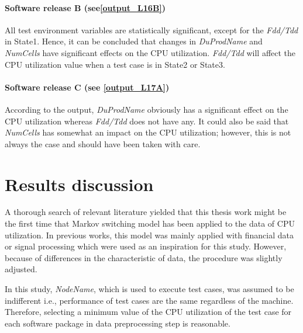 \paragraph{Software release B (see\ref{output_L16B})}

All test environment variables are statistically significant, except
for the \emph{Fdd/Tdd} in State1. Hence, it can be concluded that
changes in \emph{DuProdName} and \emph{NumCells} have significant
effects on the CPU utilization. \emph{Fdd/Tdd} will affect the CPU
utilization value when a test case is in State2 or State3. 

\paragraph{Software release C (see \ref{output_L17A})}

According to the output, \emph{DuProdName} obviously has a significant
effect on the CPU utilization whereas\emph{ Fdd/Tdd} does not have
any. It could also be said that \emph{NumCells} has somewhat an impact
on the CPU utilization; however, this is not always the case and should
have been taken with care.

\section{Results discussion\label{sec:Results-discussion}}

A thorough search of relevant literature yielded that this thesis
work might be the first time that Markov switching model has been
applied to the data of CPU utilization. In previous works, this model
was mainly applied with financial data or signal processing which
were used as an inspiration for this study. However, because of differences
in the characteristic of data, the procedure was slightly adjusted.
\begin{comment}
A large amount of time was spent on understanding the data, examining
which variables had a significant impact on the CPU utilization, and
determining which methods would provide the best possible outcome
for this problem. Besides, after deciding on the most promising method,
a lot of effort was invested studying implemented algorithms in the
R package as well as modifying code as necessary. 
\end{comment}

In this study, \emph{NodeName}, which is used to execute test cases,
was assumed to be indifferent i.e., performance of test cases are
the same regardless of the machine. Therefore, selecting a minimum
value of the CPU utilization of the test case for each software package
in data preprocessing step is reasonable. 


